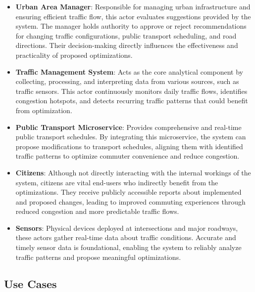 \documentclass[a4paper,12pt]{article}
\begin{document}
\begin{itemize}
    \item \textbf{Urban Area Manager}:
Responsible for managing urban infrastructure and ensuring efficient traffic flow, this actor evaluates suggestions provided by the system. The manager holds authority to approve or reject recommendations for changing traffic configurations, public transport scheduling, and road directions. Their decision-making directly influences the effectiveness and practicality of proposed optimizations.

\item \textbf{Traffic Management System}:
Acts as the core analytical component by collecting, processing, and interpreting data from various sources, such as traffic sensors. This actor continuously monitors daily traffic flows, identifies congestion hotspots, and detects recurring traffic patterns that could benefit from optimization.

\item \textbf{Public Transport Microservice}:
Provides comprehensive and real-time public transport schedules. By integrating this microservice, the system can propose modifications to transport schedules, aligning them with identified traffic patterns to optimize commuter convenience and reduce congestion.

\item \textbf{Citizens}:
Although not directly interacting with the internal workings of the system, citizens are vital end-users who indirectly benefit from the optimizations. They receive publicly accessible reports about implemented and proposed changes, leading to improved commuting experiences through reduced congestion and more predictable traffic flows.

\item \textbf{Sensors}:
Physical devices deployed at intersections and major roadways, these actors gather real-time data about traffic conditions. Accurate and timely sensor data is foundational, enabling the system to reliably analyze traffic patterns and propose meaningful optimizations.
\end{itemize}


\subsection{Use Cases}
\end{document}
